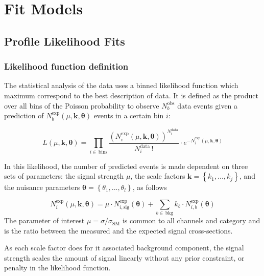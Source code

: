 \chapter{Fit Models}
\label{ch:fit-models}
\section{Profile Likelihood Fits}%
\label{sec:plf}
\subsection{Likelihood function definition}
\label{sec:lhoodDef}
The statistical analysis of the data uses a binned likelihood function which
maximum correspond to the best description of data. It is defined as the product
over all bins of the Poisson probability to observe $N^{\text{obs}}_b$ data
events given a prediction of
$N^{\text{exp}}_b(\mu,\mathbf{k},{\boldsymbol\theta})$ events in a certain bin
$i$:

\begin{equation}
  L(\mu,{\boldsymbol{k},\boldsymbol{\theta}}) = \prod_{i\in\,\text{bins}} \frac{\left( N_{i}^{\text{exp}}(\mu,{\boldsymbol{k,\theta}}) \right)^{N_{i}^{\text{data}}}}{N_{i}^{\text{data}}\,!} \cdot e^{-N_{i}^{\text{exp}}(\mu,{\boldsymbol{k,\theta}})}
  
\end{equation}

In this likelihood, the number of predicted events is made dependent on three
sets of parameters: the signal strength $\mu$, the scale factors
$\mathbf{k}=\left\{k_1, ...,k_j\right\}$, and the nuisance parameters
$\boldsymbol{\theta} = \left\{\theta_1,...,\theta_l\right\}$, as follows

\begin{equation}
  N_{i}^{\text{exp}}(\mu,\mathbf{k},\boldsymbol{\theta}) = \mu \cdot N_{i,\text{sig}}^{\text{exp}}(\boldsymbol{\theta}) + \sum_{b\in\,\text{bkg}} k_b\cdot N_{i,b}^{\text{exp}}(\boldsymbol{\theta})
  
\end{equation}
The parameter of interest $\mu=\sigma/\sigma_{\text{SM}}$ is common to all
channels and category and is the ratio between the measured and the expected
signal cross-sections.

As each scale factor does for it associated background component, the signal
strength scales the amount of signal linearly without any prior constraint, or
penalty in the likelihood function.


